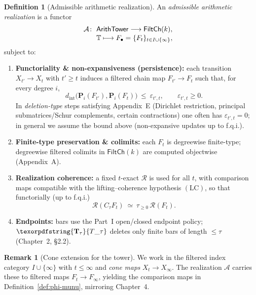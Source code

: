 \documentclass[11pt]{article}
\DeclareRobustCommand{\hyp}{\nobreakdash-}
\newcommand{\Rfun}{\mathcal{R}}
\numberwithin{equation}{section}
\theoremstyle{definition}
\newtheorem{definition}[theorem]{Definition}
\newtheorem{remark}[theorem]{Remark}
\DeclareRobustCommand{\FiltCh}[1]{\mathsf{FiltCh}(#1)}
\DeclareRobustCommand{\Ttau}{\texorpdfstring{\ensuremath{\mathbf{T}_{\tau}}}{T\_\tau}}
\DeclareRobustCommand{\LC}{\texorpdfstring{\ensuremath{\mathrm{(LC)}}}{(LC)}}
\providecommand{\n}{\unskip\space}
\begin{document}
\begin{definition}[Admissible arithmetic realization]\label{def:arith-real}
An \emph{admissible arithmetic realization} is a functor
\[
\begin{aligned}\n\mathcal{A}\colon\ & \mathsf{ArithTower}\longrightarrow \FiltCh{k},\\[-0.25em]\n& \mathbb{T}\longmapsto F_\bullet=\{F_t\}_{t\in I\cup\{\infty\}},\n\end{aligned}
\]
subject to:
\begin{enumerate}
  \item \textbf{Functoriality \& non\hyp expansiveness (persistence):} each transition \(X_{t'}\!\to X_{t}\) with \(t'\ge t\) induces a filtered chain map \(F_{t'}\!\to F_{t}\) such that, for every degree \(i\),
  \[
    d_{\mathrm{int}}\!\big(\mathbf{P}_i(F_{t'}),\mathbf{P}_i(F_{t})\big)\ \le\ \varepsilon_{t',t},\qquad \varepsilon_{t',t}\ge 0.
  \]
  In \emph{deletion\hyp type} steps satisfying Appendix~E (Dirichlet restriction, principal submatrices/Schur complements, certain contractions) one often has \(\varepsilon_{t',t}=0\); in general we assume the bound above (non\hyp expansive updates up to f.q.i.).
  \item \textbf{Finite\hyp type preservation \& colimits:} each \(F_t\) is degreewise finite\hyp type; degreewise filtered colimits in \(\FiltCh{k}\) are computed objectwise (Appendix~A).
  \item \textbf{Realization coherence:} a fixed \(t\)\hyp exact \(\Rfun\) is used for all \(t\), with comparison maps compatible with the lifting–coherence hypothesis \LC, so that functorially (up to f.q.i.)
  \[
    \Rfun(C_\tau F_t)\ \simeq\ \tau_{\ge 0}\,\Rfun(F_t).
  \]
  \item \textbf{Endpoints:} bars use the Part~I open/closed endpoint policy; \(\Ttau\) deletes only finite bars of length \(\le\tau\) (Chapter~2, §2.2).
\end{enumerate}
\end{definition}

\begin{remark}[Cone extension for the tower]\label{rk:cone-extension}
We work in the filtered index category \(I\cup\{\infty\}\) with \(t\le \infty\) and \emph{cone maps} \(X_t\to X_\infty\).
The realization \(\mathcal{A}\) carries these to filtered maps \(F_t\to F_\infty\), yielding the comparison maps in Definition~\ref{def:phi-munu}, mirroring Chapter~4.
\end{remark}
\end{document}
